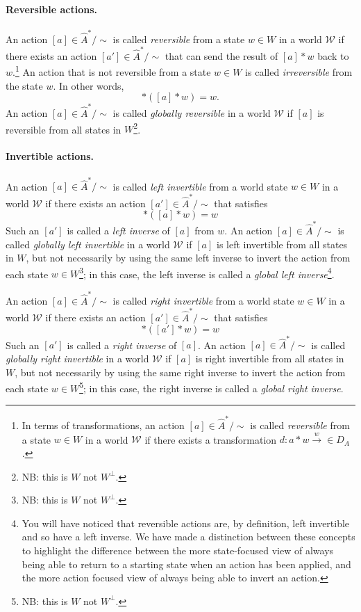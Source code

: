 \paragraph{Reversible actions.}
An action $[a] \in \hat{A}^{*}/\sim$ is called \emph{reversible} from a state $w \in W$ in a world $\mathscr{W}$ if there exists an action $[a'] \in \hat{A}^{*}/\sim$ that can send the result of $[a] \ast w$ back to $w$.\footnote{
In terms of transformations, an action $[a] \in \hat{A}^{*}/\sim$ is called \emph{reversible} from a state $w \in W$ in a world $\mathscr{W}$ if there exists a transformation $d: a * w \xrightarrow w \in D_{A}$.
}
An action that is not reversible from a state $w \in W$ is called \emph{irreversible} from the state $w$.
In other words,
\begin{equation}
    [a'] * ([a] * w) = w.
\end{equation}
An action $[a] \in \hat{A}^{*}/\sim$ is called \emph{globally reversible} in a world $\mathscr{W}$ if $[a]$ is reversible from all states in $W$\footnote{
NB: this is $W$ not $W^{\bot}$.
}.

\paragraph{Invertible actions.}
An action $[a] \in \hat{A}^{*}/\sim$ is called \emph{left invertible} from a world state $w \in W$ in a world $\mathscr{W}$ if there exists an action $[a'] \in \hat{A}^{*}/\sim$ that satisfies
\begin{equation}
    [a'] * ([a] * w) = w
\end{equation}
Such an $[a']$ is called a \emph{left inverse} of $[a]$ from $w$.
An action $[a] \in \hat{A}^{*}/\sim$ is called \emph{globally left invertible} in a world $\mathscr{W}$ if $[a]$ is left invertible from all states in $W$, but not necessarily by using the same left inverse to invert the action from each state $w \in W$\footnote{
NB: this is $W$ not $W^{\bot}$.
}; in this case, the left inverse is called a \emph{global left inverse}\footnote{
You will have noticed that reversible actions are, by definition, left invertible and so have a left inverse.
We have made a distinction between these concepts to highlight the difference between the more state-focused view of always being able to return to a starting state when an action has been applied, and the more action focused view of always being able to invert an action.
}.

An action $[a] \in \hat{A}^{*}/\sim$ is called \emph{right invertible} from a world state $w \in W$ in a world $\mathscr{W}$ if there exists an action $[a'] \in \hat{A}^{*}/\sim$ that satisfies
\begin{equation}
    [a] * ([a'] * w) = w
\end{equation}
Such an $[a']$ is called a \emph{right inverse} of $[a]$.
An action $[a] \in \hat{A}^{*}/\sim$ is called \emph{globally right invertible} in a world $\mathscr{W}$ if $[a]$ is right invertible from all states in $W$, but not necessarily by using the same right inverse to invert the action from each state $w \in W$\footnote{
NB: this is $W$ not $W^{\bot}$.
}; in this case, the right inverse is called a \emph{global right inverse}.

